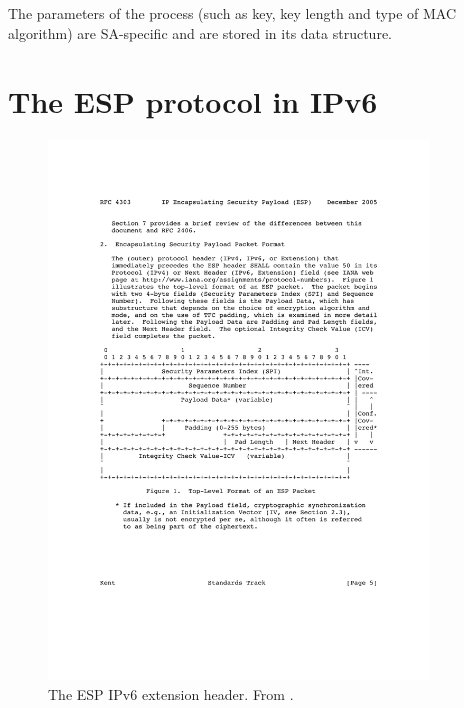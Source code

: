 \documentclass[final,a4paper,twoside,11pt,onecolumn]{report}
\begin{document}
The parameters of the process (such as key, key length and type of MAC algorithm) are SA-specific and are stored in its data structure.




\section{The ESP protocol in IPv6}
\label{sec:bgesp}

\begin{figure}[h!]

   \includegraphics[width=0.9\textwidth]{esp_nextheader}
   \caption{The ESP IPv6 extension header. From \cite{rfc4303}.}
   \label{fig:wiki-ipsec-esp}
\end{figure}
\end{document}
